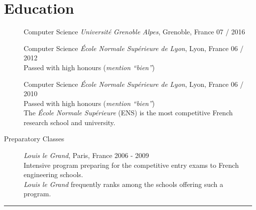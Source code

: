 \documentclass[english,9pt]{extarticle}
\begin{document}
\section*{Education}
\begin{adjustwidth}{1em}{}
	\begin{description}
		\item[{}] Computer Science \quad \textit{Université Grenoble Alpes},
			Grenoble, France \hfill 07 / 2016
		\item[{}] Computer Science \quad \textit{\'Ecole Normale Supérieure de
			Lyon}, Lyon, France \hfill 06 / 2012 \\
			Passed with high honours (\textit{mention ``bien''})
		\item[{}] Computer Science \quad \textit{\'Ecole Normale Supérieure de
			Lyon}, Lyon, France \hfill 06 / 2010 \\
			Passed with high honours (\textit{mention ``bien''}) \\
			The \emph{\'Ecole Normale Supérieure} (ENS) is the most competitive French research school and
			university.
		\item[Preparatory Classes] \quad \textit{Louis le Grand}, Paris, France \hfill 2006 - 2009 \\
			Intensive program preparing for the competitive entry exams to French engineering schools. \\
			\emph{Louis le Grand} frequently ranks  among the schools offering such a program.
	\end{description}
\end{adjustwidth}


\noindent\rule{\textwidth}{1pt}

\end{document}
